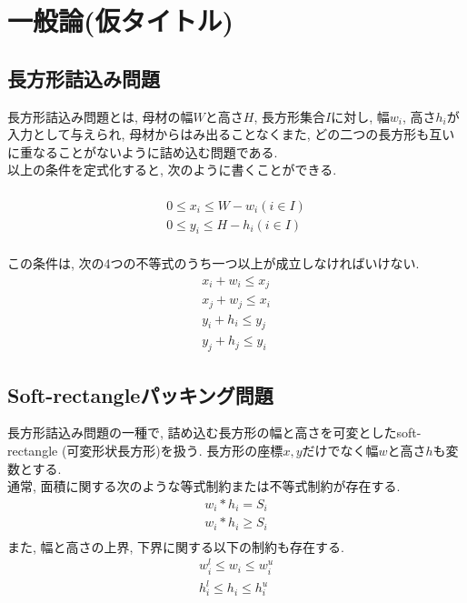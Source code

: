 \section{一般論(仮タイトル)}

\subsection{長方形詰込み問題}
長方形詰込み問題とは, 母材の幅$W$と高さ$H$, 長方形集合$I$に対し, 幅$w_i$, 高さ$h_i$が入力として与えられ, 母材からはみ出ることなくまた, どの二つの長方形も互いに重なることがないように詰め込む問題である. \\
以上の条件を定式化すると, 次のように書くことができる. \\
\\
\begin{eqnarray}
    0 \leq x_i \leq W-w_i (i \in I)\\
    0 \leq y_i \leq H-h_i (i \in I)
\end{eqnarray}
\\
この条件は, 次の4つの不等式のうち一つ以上が成立しなければいけない.  
\begin{eqnarray}
    x_i + w_i \leq x_j \\
    x_j + w_j \leq x_i \\
    y_i + h_i \leq y_j \\
    y_j + h_j \leq y_i
\end{eqnarray}

\subsection{Soft-rectangleパッキング問題}
長方形詰込み問題の一種で, 詰め込む長方形の幅と高さを可変としたsoft-rectangle (可変形状長方形)を扱う\cite{soft-rectangle}. 
長方形の座標$x,y$だけでなく幅$w$と高さ$h$も変数とする. \\
通常, 面積に関する次のような等式制約または不等式制約が存在する. \\
\begin{eqnarray}
    w_i * h_i = S_i \\
    w_i * h_i \geq S_i \\
\end{eqnarray}
また, 幅と高さの上界, 下界に関する以下の制約も存在する. 
\begin{eqnarray}
    w_i^l \leq w_i \leq w_i^u \\
    h_i^l \leq h_i \leq h_i^u
\end{eqnarray}

